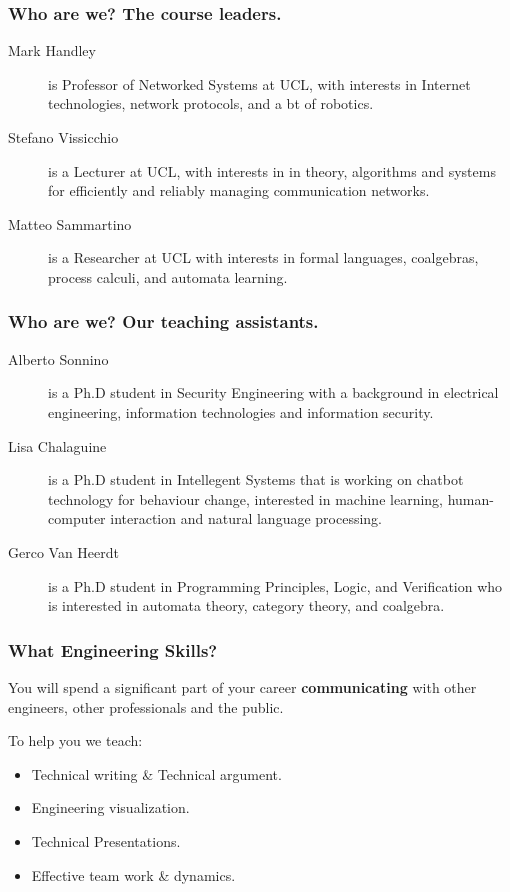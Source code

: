 \documentclass{beamer} %
\newcommand\emc[1]{\textcolor{midred}{\textbf{#1}}}
\begin{document}
\begin{frame}
\frametitle{Who are we? The course leaders.} 

\begin{description}
\item[Mark Handley] is Professor of Networked Systems at UCL, with interests in Internet technologies, network protocols, and a bt of robotics.
\item[Stefano Vissicchio] is a Lecturer at UCL, with interests in in theory, algorithms and systems for efficiently and reliably managing communication networks.
\item[Matteo Sammartino] is a Researcher at UCL with interests in formal languages, coalgebras, process calculi, and automata learning.
\end{description}

\end{frame}

\begin{frame}
\frametitle{Who are we? Our teaching assistants.} 

\begin{description}
\item[Alberto Sonnino] is a Ph.D student in Security Engineering with a background in electrical engineering, information technologies and information security.
\item[Lisa Chalaguine] is a Ph.D student in Intellegent Systems that is working on chatbot technology for behaviour change, interested in machine learning, human-computer interaction and natural language processing. 
\item[Gerco Van Heerdt] is a Ph.D student in Programming Principles, Logic, and Verification who is interested in automata theory, category theory, and coalgebra.
\end{description}

\end{frame}


\begin{frame}
\frametitle{What Engineering Skills?} 

You will spend a significant part of your career \emc{communicating} with other engineers, other professionals and the public.

\vspace{3mm}
To help you we teach:
\begin{itemize}
\item Technical writing \& Technical argument.
\item Engineering visualization.
\item Technical Presentations.
\item Effective team work \& dynamics.
\end{itemize}
\end{frame}
\end{document}
